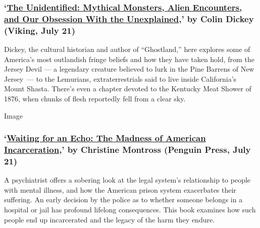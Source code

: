 \hypertarget{the-unidentified-mythical-monsters-alien-encounters-and-our-obsession-with-the-unexplained-by-colin-dickey-viking-july-21}{%
\subsubsection{\texorpdfstring{`\href{https://www.penguinrandomhouse.com/books/564449/the-unidentified-by-colin-dickey/}{The
Unidentified: Mythical Monsters, Alien Encounters, and Our Obsession
With the Unexplained},' by Colin Dickey (Viking, July
21)}{`The Unidentified: Mythical Monsters, Alien Encounters, and Our Obsession With the Unexplained,' by Colin Dickey (Viking, July 21)}}\label{the-unidentified-mythical-monsters-alien-encounters-and-our-obsession-with-the-unexplained-by-colin-dickey-viking-july-21}}

Dickey, the cultural historian and author of ``Ghostland,'' here
explores some of America's most outlandish fringe beliefs and how they
have taken hold, from the Jersey Devil --- a legendary creature believed
to lurk in the Pine Barrens of New Jersey~--- to the Lemurians,
extraterrestrials said to live inside California's Mount Shasta. There's
even a chapter devoted to the Kentucky Meat Shower of 1876, when chunks
of flesh reportedly fell from a clear sky.

Image

\hypertarget{waiting-for-an-echo-the-madness-of-american-incarceration-by-christine-montross-penguin-press-july-21}{%
\subsubsection{\texorpdfstring{`\href{https://www.penguinrandomhouse.com/books/315949/waiting-for-an-echo-by-christine-montross-md/9781594205972}{Waiting
for an Echo: The Madness of American Incarceration},' by Christine
Montross (Penguin Press, July
21)}{`Waiting for an Echo: The Madness of American Incarceration,' by Christine Montross (Penguin Press, July 21)}}\label{waiting-for-an-echo-the-madness-of-american-incarceration-by-christine-montross-penguin-press-july-21}}

A psychiatrist offers a sobering look at the legal system's relationship
to people with mental illness, and how the American prison system
exacerbates their suffering. An early decision by the police as to
whether someone belongs in a hospital or jail has profound lifelong
consequences. This book examines how such people end up incarcerated and
the legacy of the harm they endure.


